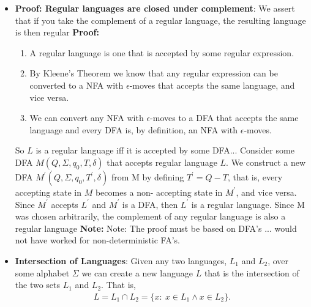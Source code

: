 \documentclass{report}
\begin{document}
\begin{itemize}
        \item \textbf{Proof: Regular languages are closed under complement}: We assert that if you take the complement of a regular language, the resulting language is then regular
            \bigbreak \noindent 
            \textbf{Proof:}
            \begin{enumerate}
                \item A regular language is one that is accepted by some regular expression.
               \item By Kleene's Theorem we know that any regular expression can be converted to a NFA with $\epsilon$-moves that accepts the same language, and vice versa.
                \item  We can convert any NFA with $\epsilon$-moves to a DFA that accepts the same language and every DFA is, by definition, an NFA with $\epsilon$-moves. 
            \end{enumerate}
            So $L$ is a regular language iff it is accepted by some DFA...
            \bigbreak \noindent 
            Consider some DFA $M(Q, \Sigma, q_{0}, T, \delta)$ that accepts regular language $L$.
            \bigbreak \noindent 
            We construct a new DFA $M^{\prime}(Q, \Sigma, q_{0}, T^{\prime}, \delta)$ from M by defining $T^{\prime} = Q - T$, that is, every accepting state in $M$ becomes a non- accepting state in $M^{\prime}$, and vice versa.
            \bigbreak \noindent 
            Since $M^{\prime}$ accepts $L^{\prime}$ and $M^{\prime}$ is a DFA, then $L^{\prime}$ is a regular language.
            \bigbreak \noindent 
            Since M was chosen arbitrarily, the complement of any regular language is also a regular language
            \bigbreak \noindent 
            \blacksquare
            \bigbreak \noindent 
            \textbf{Note:} Note: The proof must be based on DFA's ... would not have worked for non-deterministic FA's.
        \item \textbf{Intersection of Languages}:
            Given any two languages, $L_{1}$ and $L_{2}$, over some alphabet $\Sigma$ we can create a new language $L$ that is the intersection of the two sets $L_{1}$ and $L_{2}$.
            \bigbreak \noindent 
            That is, 
            \begin{align*}
                L = L_{1} \cap L_{2} = \{x:\ x \in L_{1} \land x\in L_{2} \}
            .\end{align*}

\end{itemize}
\end{document}
